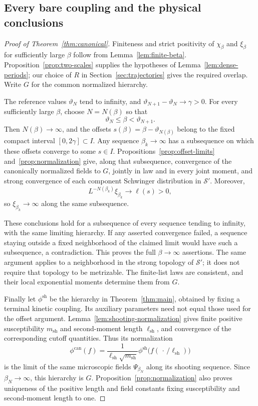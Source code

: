 \subsection{Every bare coupling and the physical conclusions}

\begin{proof}[Proof of Theorem~\ref{thm:canonical}]
Finiteness and strict positivity of $\chi_\beta$ and $\xi_\beta$ for
sufficiently large $\beta$ follow from Lemma~\ref{lem:finite-beta}.
Proposition~\ref{prop:two-scales} supplies the hypotheses of
Lemma~\ref{lem:dense-periods}; our choice of $R$ in
Section~\ref{sec:trajectories} gives the required overlap.  Write $G$
for the common normalized hierarchy.

The reference values $\vartheta_N$ tend to infinity, and
$\vartheta_{N+1}-\vartheta_N\to\gamma>0$.  For every sufficiently large
$\beta$, choose $N=N(\beta)$ so that
\[
 \vartheta_N\le\beta<\vartheta_{N+1}.
\]
Then $N(\beta)\to\infty$, and the offsets
$s(\beta)=\beta-\vartheta_{N(\beta)}$ belong to the fixed compact interval
$[0,2\gamma]\subset I$.  Any sequence $\beta_k\to\infty$ has a
subsequence on which these offsets converge to some $s\in I$.
Propositions~\ref{prop:offset-limits} and~\ref{prop:normalization}
give, along that subsequence, convergence of the canonically normalized
fields to $G$, jointly in law and in every joint moment, and strong
convergence of each component Schwinger distribution in $\mathcal S'$.
Moreover,
\[
 L^{-N(\beta_k)}\xi_{\beta_k}\longrightarrow\ell(s)>0,
\]
so $\xi_{\beta_k}\to\infty$ along the same subsequence.

These conclusions hold for a subsequence of every sequence tending to
infinity, with the same limiting hierarchy.  If any asserted convergence
failed, a sequence staying outside a fixed neighborhood of the claimed
limit would have such a subsequence, a contradiction.  This proves the
full $\beta\to\infty$ assertions.  The same argument applies to a
neighborhood in the strong topology of $\mathcal S'$; it does not require
that topology to be metrizable.  The finite-list laws are consistent, and
their local exponential moments determine them from $G$.

Finally let $\phi^{\mathrm{sh}}$ be the hierarchy in
Theorem~\ref{thm:main}, obtained by fixing a terminal kinetic coupling.
Its auxiliary parameters need not equal those used for the offset
argument.  Lemma~\ref{lem:shooting-normalization} gives finite positive
susceptibility $m_{\mathrm{sh}}$ and second-moment length
$\ell_{\mathrm{sh}}$, and convergence of the corresponding cutoff
quantities.  Thus its normalization
\begin{equation}\label{eq:uni-shooting-identification}
 \phi^{\mathrm{can}}(f)
 =\frac{1}{\ell_{\mathrm{sh}}\sqrt{m_{\mathrm{sh}}}}
    \phi^{\mathrm{sh}}\bigl(f(\,\cdot\,/\ell_{\mathrm{sh}})\bigr)
\end{equation}
is the limit of the same microscopic fields $\Psi_{\beta_N}$ along its
shooting sequence.  Since $\beta_N\to\infty$, this hierarchy is $G$.
Proposition~\ref{prop:normalization} also proves uniqueness of the
positive length and field constants fixing susceptibility and
second-moment length to one.
\end{proof}

